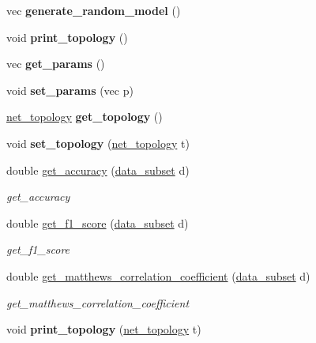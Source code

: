 \begin{DoxyCompactItemize}
\item 
\hypertarget{classNeuralNet_ae24cbf6ab4032ca16983dbed084b6d85}{vec {\bfseries generate\-\_\-random\-\_\-model} ()}\label{classNeuralNet_ae24cbf6ab4032ca16983dbed084b6d85}

\item 
\hypertarget{classNeuralNet_a7749da58906658bed5b008c6022807ee}{void {\bfseries print\-\_\-topology} ()}\label{classNeuralNet_a7749da58906658bed5b008c6022807ee}

\item 
\hypertarget{classNeuralNet_a41636bc3b34948ad3da08980af76387d}{vec {\bfseries get\-\_\-params} ()}\label{classNeuralNet_a41636bc3b34948ad3da08980af76387d}

\item 
\hypertarget{classNeuralNet_af9a25d684ca80c51953bfef7fd443e2d}{void {\bfseries set\-\_\-params} (vec p)}\label{classNeuralNet_af9a25d684ca80c51953bfef7fd443e2d}

\item 
\hypertarget{classNeuralNet_ad32dd2df156318945f665949f1759875}{\hyperlink{structnet__topology}{net\-\_\-topology} {\bfseries get\-\_\-topology} ()}\label{classNeuralNet_ad32dd2df156318945f665949f1759875}

\item 
\hypertarget{classNeuralNet_a241e0975c735bff8804fe42a205d0b39}{void {\bfseries set\-\_\-topology} (\hyperlink{structnet__topology}{net\-\_\-topology} t)}\label{classNeuralNet_a241e0975c735bff8804fe42a205d0b39}

\item 
double \hyperlink{classNeuralNet_ab7227a1d2bebbc92c1c7dc5a952ad2cc}{get\-\_\-accuracy} (\hyperlink{structdata__subset}{data\-\_\-subset} d)
\begin{DoxyCompactList}\small\item\em get\-\_\-accuracy \end{DoxyCompactList}\item 
double \hyperlink{classNeuralNet_aecea67ed4059c88b0b74c13f0c7c52a7}{get\-\_\-f1\-\_\-score} (\hyperlink{structdata__subset}{data\-\_\-subset} d)
\begin{DoxyCompactList}\small\item\em get\-\_\-f1\-\_\-score \end{DoxyCompactList}\item 
double \hyperlink{classNeuralNet_a97703e2851b62dbdd0ded415542d8614}{get\-\_\-matthews\-\_\-correlation\-\_\-coefficient} (\hyperlink{structdata__subset}{data\-\_\-subset} d)
\begin{DoxyCompactList}\small\item\em get\-\_\-matthews\-\_\-correlation\-\_\-coefficient \end{DoxyCompactList}\item 
\hypertarget{classNeuralNet_adc22e85172dc8cd50ebcda46d8b9ba58}{void {\bfseries print\-\_\-topology} (\hyperlink{structnet__topology}{net\-\_\-topology} t)}\label{classNeuralNet_adc22e85172dc8cd50ebcda46d8b9ba58}


\end{DoxyCompactItemize}
